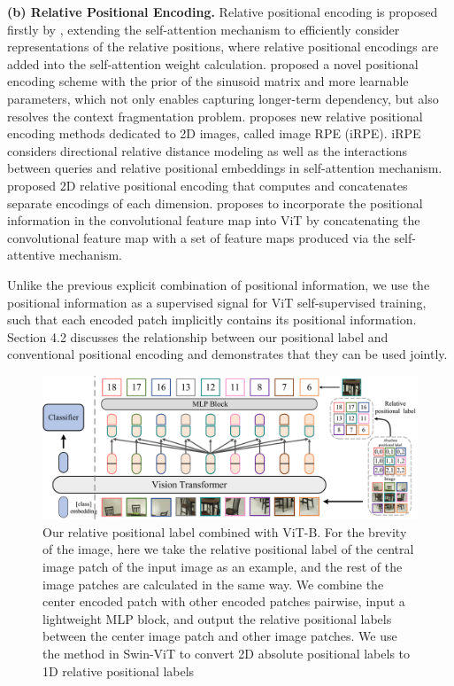 \documentclass{article}
\begin{document}
\noindent \textbf{(b) Relative Positional Encoding.} Relative positional encoding is proposed ﬁrstly by \cite{DBLP:journals/corr/abs-1803-02155}, extending the self-attention mechanism to efficiently consider representations of the relative positions, where relative positional encodings are added into the self-attention weight calculation. \cite{DBLP:journals/corr/abs-1901-02860} proposed a novel positional encoding scheme with the prior of the sinusoid matrix and more learnable parameters, which not only enables capturing longer-term dependency, but also resolves the context fragmentation problem. \cite{Wu_2021_ICCV} proposes new relative positional encoding methods dedicated to 2D images, called image RPE (iRPE). iRPE considers directional relative distance modeling as well as the interactions between queries and relative positional embeddings in self-attention mechanism. \cite{NEURIPS2019_3416a75f} proposed 2D relative positional encoding that computes and concatenates separate encodings of each dimension. \cite{Srinivas_2021_CVPR} proposes to incorporate the positional information in the convolutional feature map into ViT by concatenating the convolutional feature map with a set of feature maps produced via the self-attentive mechanism. 

Unlike the previous explicit combination of positional information, we use the positional information as a supervised signal for ViT self-supervised training, such that each encoded patch implicitly contains its positional information. Section 4.2 discusses the relationship between our positional label and conventional positional encoding and demonstrates that they can be used jointly.

\begin{figure}[t]
\centering
\includegraphics[width=0.9\linewidth]{RelativePosition.pdf} %
\caption{Our relative positional label combined with ViT-B. For the brevity of the image, here we take the relative positional label of the central image patch of the input image as an example, and the rest of the image patches are calculated in the same way. We combine the center encoded patch with other encoded patches pairwise, input a lightweight MLP block, and output the relative positional labels between the center image patch and other image patches. We use the method in Swin-ViT to convert 2D absolute positional labels to 1D relative positional labels}
\label{relative position-flabel}
\end{figure}
\end{document}
